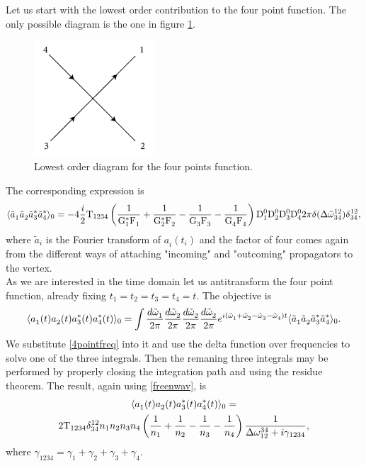 Let us start with the lowest order contribution to the four point function. The only possible diagram is the one in figure \ref{fig:treefourpoints}.
\begin{figure}[ht]
    \centering
    \includegraphics[width=0.4\textwidth]{images/quarticvertex.jpg}
    \caption{Lowest order diagram for the four points function.}
    \label{fig:treefourpoints}
\end{figure}
The corresponding expression is
\begin{equation}
    \langle \tilde{a}_1^{} \tilde{a}_2^{} \tilde{a}_3^{*}\tilde{a}_4^{*} \rangle_{0} = -4\frac{i}{2} \mathrm{T}_{1234}\left(\dfrac{1}{\mathrm{G}_1^*\mathrm{F}_1^{}}+\dfrac{1}{\mathrm{G}_2^*\mathrm{F}_2^{}}-\dfrac{1}{\mathrm{G}_3^{}\mathrm{F}_3^{}}
    -\dfrac{1}{\mathrm{G}_4^{}\mathrm{F}_4^{}}\right)\mathrm{D}_1^0\mathrm{D}_2^0\mathrm{D}_3^0\mathrm{D}_4^0 2\pi \delta(\Delta{\tilde{\omega}}^{12}_{34})\delta^{12}_{34},
    \label{4pointfreq}
\end{equation}
where $\tilde{a}_i^{}$ is the Fourier transform of $a_i^{}(t_i)$ and the factor of four comes again from the different ways of attaching "incoming" and "outcoming" 
propagators to the vertex.\\
As we are interested in the time domain let us antitransform the four point function, already fixing $t_1 = t_2 = t_3 = t_4 = t$. The objective is
\begin{equation}
    \langle a_1^{}(t) a_2^{}(t) a_3^*(t) a_4^*(t) \rangle_0 = \int \frac{d\tilde{\omega}^{}_1}{2\pi}\frac{d\tilde{\omega}^{}_2}{2\pi}\frac{d\tilde{\omega}^{}_2}{2\pi}\frac{d\tilde{\omega}^{}_2}{2\pi}
    e^{i(\tilde{\omega}^{}_1 + \tilde{\omega}^{}_2  -\tilde{\omega}^{}_3 - \tilde{\omega}^{}_4)t} \langle \tilde{a}_1^{} \tilde{a}_2^{} \tilde{a}_3^{*}\tilde{a}_4^{*} \rangle_{0}.
    \label{antitransform4}
\end{equation}
We substitute \eqref{4pointfreq} into it and use the delta function over frequencies to solve one of the three integrals. Then the remaning three integrals may 
be performed by properly closing the integration path and using the residue theorem. The result, again using \eqref{freenwav}, is
\begin{multline}
    \langle a_1^{}(t) a_2^{}(t) a_3^*(t) a_4^*(t) \rangle_0 = \\
    2\mathrm{T}_{1234}\delta^{12}_{34}n_1 n_2 n_3 n_4\left( \frac{1}{n_1}+\frac{1}{n_2}-\frac{1}{n_3}-\frac{1}{n_4} \right)
    \frac{1}{\Delta{\omega}^{34}_{12} + i\gamma_{1234}},
    \label{fourpointtree}
\end{multline}  
where $\gamma_{1234} = \gamma_1 + \gamma_2 + \gamma_3 + \gamma_4$. \\

